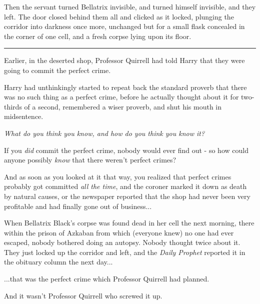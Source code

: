 Then the servant turned Bellatrix invisible, and turned himself
invisible, and they left. The door closed behind them all and clicked as
it locked, plunging the corridor into darkness once more, unchanged but
for a small flask concealed in the corner of one cell, and a fresh
corpse lying upon its floor.

\begin{center}\rule{3in}{0.4pt}\end{center}

Earlier, in the deserted shop, Professor Quirrell had told Harry that
they were going to commit the perfect crime.

Harry had unthinkingly started to repeat back the standard proverb that
there was no such thing as a perfect crime, before he actually thought
about it for two-thirds of a second, remembered a wiser proverb, and
shut his mouth in midsentence.

\emph{What do you think you know, and how do you think you know it?}

If you \emph{did} commit the perfect crime, nobody would ever find out -
so how could anyone possibly \emph{know} that there weren't perfect
crimes?

And as soon as you looked at it that way, you realized that perfect
crimes probably got committed \emph{all the time}, and the coroner
marked it down as death by natural causes, or the newspaper reported
that the shop had never been very profitable and had finally gone out of
business...

When Bellatrix Black's corpse was found dead in her cell the next
morning, there within the prison of Azkaban from which (everyone knew)
no one had ever escaped, nobody bothered doing an autopsy. Nobody
thought twice about it. They just locked up the corridor and left, and
the \emph{Daily Prophet} reported it in the obituary column the next
day...

...that was the perfect crime which Professor Quirrell had planned.

And it wasn't Professor Quirrell who screwed it up.
